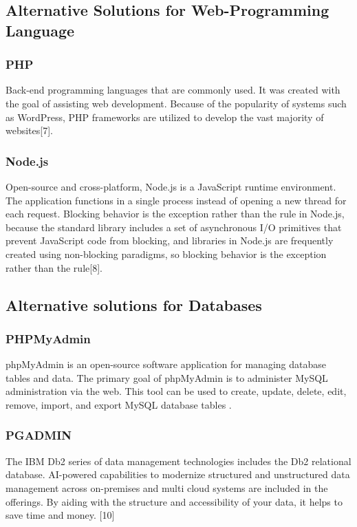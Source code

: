 \documentclass[11pt]{article}
\newcommand\tab[1][1cm]{\hspace*{#1}}
\begin{document}
\subsection{Alternative Solutions for Web-Programming Language}

\subsubsection{PHP}
\tab Back-end programming languages that are commonly used. It was created with the goal of assisting web development. Because of the popularity of systems such as WordPress, PHP frameworks are utilized to develop the vast majority of websites[7].

\subsubsection{Node.js}

\tab Open-source and cross-platform, Node.js is a JavaScript runtime environment. The application functions in a single process instead of opening a new thread for each request. Blocking behavior is the exception rather than the rule in Node.js, because the standard library includes a set of asynchronous I/O primitives that prevent JavaScript code from blocking, and libraries in Node.js are frequently created using non-blocking paradigms, so blocking behavior is the exception rather than the rule[8].

\subsection{Alternative solutions for Databases}

\subsubsection{PHPMyAdmin}
\tab phpMyAdmin is an open-source software application for managing database tables and data. The primary goal of phpMyAdmin is to administer MySQL administration via the web. This tool can be used to create, update, delete, edit, remove, import, and export MySQL database tables \cite{phpAdminIntro}.
\subsubsection{PGADMIN}

\tab The IBM Db2 series of data management technologies includes the Db2 relational database. AI-powered capabilities to modernize structured and unstructured data management across on-premises and multi cloud systems are included in the offerings. By aiding with the structure and accessibility of your data, it helps to save time and money.
[10]
\end{document}
